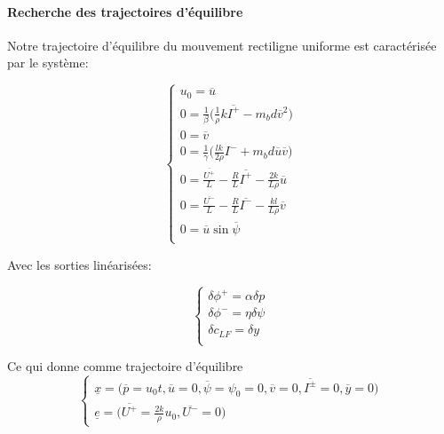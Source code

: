 \documentclass{report}
\begin{document}
\paragraph{Recherche des trajectoires d'équilibre}

Notre trajectoire d'équilibre du mouvement rectiligne uniforme 
est caractérisée par le système:

\begin{equation*}
    \begin{cases}
        u_0 = \overline{u} \\
        0 = \frac{1}{\beta}\big( \frac{1}{\rho}k\overline{I^{+}} - m_bd\overline{v}^2 \big) \\
        0 = \overline{v} \\
        0 = \frac{1}{\gamma}\big( \frac{lk}{2\rho}I^{-} + m_bd\overline{u}\overline{v} \big) \\
        0 = \frac{\overline{U^{+}}}{L} - \frac{R}{L}\overline{I^{+}} - \frac{2k}{L\rho}\overline{u} \\
        0 = \frac{\overline{U^{-}}}{L} - \frac{R}{L}\overline{I^{-}} - \frac{kl}{L\rho}\overline{v} \\
        0 = \overline{u}\sin\overline{\psi} \\
    \end{cases}
\end{equation*}

Avec les sorties linéarisées:

\begin{equation*}
    \begin{cases}
        \delta \phi^{+} = \alpha \delta p \\
        \delta \phi^{-} = \eta \delta \psi \\
        \delta c_{LF} = \delta y \\
    \end{cases}
\end{equation*}

Ce qui donne comme trajectoire d'équilibre 
\begin{equation*}
    \begin{cases}
        \underline{x} = \big(\overline{p}=u_0t, \overline{u}=0, \overline{\psi}=\psi_0=0, 
        \overline{v}=0, \overline{I^{\pm}}=0, \overline{y}=0 \big) \\
        \underline{e} = \big( \overline{U^{+}}=\frac{2k}{\rho} u_0, \overline{U^{-}}=0 \big)
    \end{cases}
\end{equation*}
\end{document}
